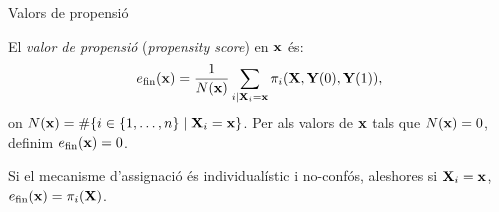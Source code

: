 \documentclass{bestbeamer}
\begin{document}
\begin{frame}{Valors de propensió}
\begin{definition}
El \textit{valor de propensió} (\textit{propensity score}) en $\mathbf{x}$ és:
\begin{equation*}
e_{\mathrm{fin}}(\mathbf{x})=\frac{1}{N(\mathbf{x})}\sum_{i\mid \mathbf{X}_i=\mathbf{x}}\pi_i(\mathbf{X},\mathbf{Y}(0),\mathbf{Y}(1)),
\end{equation*}
on $N(\mathbf{x})=\#\{i\in\{1,\dotsc,n\}\mid \mathbf{X}_i=\mathbf{x}\}$. Per als valors de $\mathbf{x}$ tals que $N(\mathbf{x})=0$, definim $e_{\mathrm{fin}}(\mathbf{x})=0$.
\end{definition}
\begin{prop}\label{prop:propensio-unitaria}
Si el mecanisme d'assignació és individualístic i no-confós, aleshores si $\mathbf{X}_i=\mathbf{x}$, $e_{\mathrm{fin}}(\mathbf{x})=\pi_i(\mathbf{X})$.
\end{prop}
\end{frame}
\end{document}
